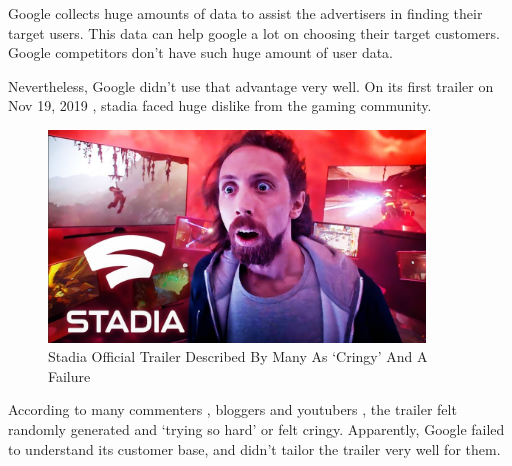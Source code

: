 Google collects huge amounts of data to assist the advertisers in finding their target users. 
This data can help google a lot on choosing their target customers.
Google competitors don't have such huge amount of user data.

Nevertheless, Google didn't use that advantage very well. 
On its first trailer on Nov 19, 2019 \cite{stadiaTrailer}, stadia faced huge dislike from the gaming community.

\begin{figure}[H]
    \centering
    \includegraphics[width=10cm]{images/stadiaThumbnail.jpg}
    \caption{Stadia Official Trailer Described By Many As `Cringy' And A Failure}
    \label{fig:stadiaThumbnail}
\end{figure}

According to many commenters \cite{redditCrit}, bloggers \cite{kotakuCrit} \cite{ccn} and youtubers \cite{rerezCritTrailer} , the trailer felt randomly generated and `trying so hard' or felt cringy.
Apparently, Google failed to understand its customer base, and didn't tailor the trailer very well for them.
